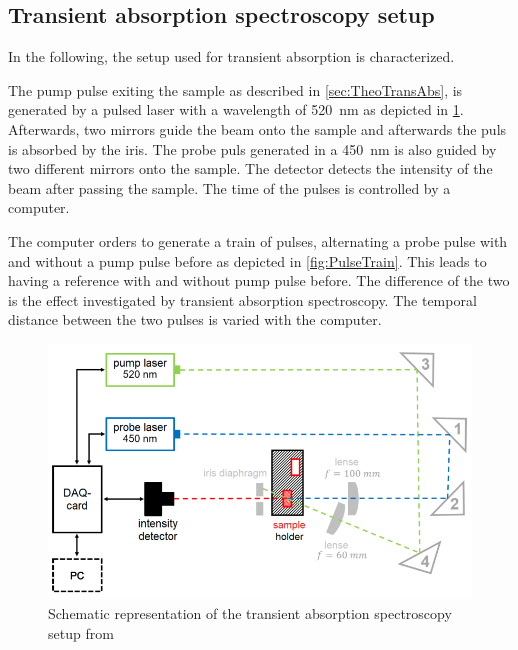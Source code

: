 \subsection{Transient absorption spectroscopy setup}

In the following, the setup used for transient absorption is characterized. 

The pump pulse exiting the sample as described in \cref{sec:TheoTransAbs}, is generated by a pulsed laser with a wavelength of \SI{520}{\nano\meter} as depicted in \cref{fig:TRANSsetup}.
Afterwards, two mirrors guide the beam onto the sample and afterwards the puls is absorbed by the iris. The probe puls generated in a \SI{450}{\nano\meter} is  also guided by two different mirrors onto the sample. 
The detector detects the intensity of the beam after passing the sample. The time of the pulses is controlled by a computer. 

The computer orders to generate a train of pulses, alternating a probe pulse with and without a pump pulse before as depicted in \cref{fig:PulseTrain}. This leads to having a reference with and without pump pulse before. The difference of the two is the effect investigated by transient absorption spectroscopy. 
The temporal distance between the two pulses is varied with the computer.
\begin{figure}[ht]
    \centering
    \includegraphics[width = 13cm]{Bilder/Grundlagen/TRANSsetup.png}
    \caption{Schematic representation of the transient absorption spectroscopy setup from \cite{Kilchert.04.2023}}
    \label{fig:TRANSsetup}
\end{figure}

